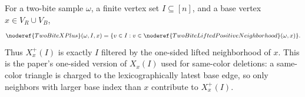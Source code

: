 \begin{definition}
For a two-bite sample \(\omega\), a finite vertex set \(I\subseteq[n]\), and a
base vertex \(x\in V_R\cup V_B\),
\[
\noderef{TwoBiteXPlus}(\omega,I,x)
=\{v\in I: v\in\noderef{TwoBiteLiftedPositiveNeighborhood}(\omega,x)\}.
\]
Thus \(X_x^+(I)\) is exactly \(I\) filtered by the one-sided lifted
neighborhood of \(x\).  This is the paper's one-sided version of \(X_x(I)\)
used for same-color deletions: a same-color triangle is charged to the
lexicographically latest base edge, so only neighbors with larger base index
than \(x\) contribute to \(X_x^+(I)\).
\end{definition}

